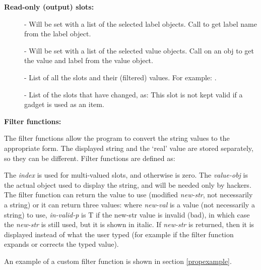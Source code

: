 {\bf Read-only (output) slots:}

\begin{description}
\item[]  - Will be set with a list of the selected label objects.
Call  to get label name from the label object.

\item[]  - Will be set with a list of the selected value objects.
Call  on an obj to get the value and
label from the value object.

\item[]  - List of all the slots and their (filtered) values.  For example:
.

\item[]  - List of the slots that have changed, as:
This slot is not kept valid if a gadget is used as an item.
\end{description}

{\bf Filter functions:}

The filter functions allow the program to convert the string values
to the appropriate form.  The displayed string and the `real'
value are stored separately, so they can be different.  Filter functions are
defined as:

The {\it index} is used for multi-valued slots, and otherwise is zero.
The {\it value-obj} is the actual object used to display the string, and will
be needed only by hackers.
The filter function can return the value to use (modified {\it new-str}, not
necessarily a string) or it can return three values:
where {\it new-val} is a value (not necessarily a string) to use, {\it in-valid-p}
is T if the new-str value is invalid (bad), in which case the {\it new-str} is
still used, but it is shown in italic.  If {\it new-str} is returned, then it is
displayed instead of what the user typed (for example if the filter function
expands or corrects the typed value).

An example of a custom filter function is shown in section \ref{propexample}.

